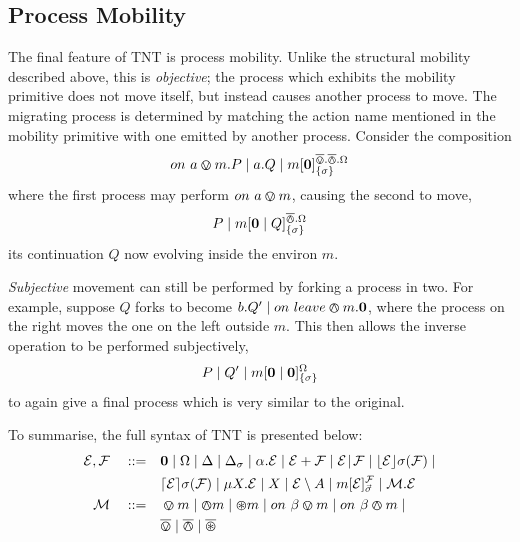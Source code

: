 \documentclass{acm_proc_article-sp}
\begin{document}
\subsection{Process Mobility}
\label{procmob}

The final feature of TNT is process mobility. Unlike the structural
mobility described above, this is \emph{objective}; the process which
exhibits the mobility primitive does not move itself, but instead causes
another process to move.  The migrating process is determined by
matching the action name mentioned in the mobility primitive with one
emitted by another process.  Consider the composition
\begin{displaymath}
  on\ a \varovee m.P \mid a.Q \mid {m}[ \textbf{0} ]^{\overline{\varovee}.\overline{\varowedge}.\Omega}_{\{\sigma\}}
\end{displaymath}
where the first process may perform $on\ a \varovee m$, causing the second
to move,
\begin{displaymath}
P \mid {m}[ \textbf{0} \mid Q ]^{\overline{\varowedge}.\Omega}_{\{\sigma\}}
\end{displaymath}
its continuation $Q$ now evolving inside the environ $m$.

\emph{Subjective} movement can still be performed by forking a process
in two. For example, suppose $Q$ forks to become $b.Q' \mid
on\ leave \varowedge m.\textbf{0}$, where the process on the right moves the one
on the left outside $m$. This then allows the inverse operation to be
performed subjectively,
\begin{displaymath}
P \mid Q' \mid {m}[ \textbf{0} \mid \textbf{0} ]^{\Omega}_{\{\sigma\}}
\end{displaymath}
to again give a final process which is very similar to the original.

To summarise, the full syntax of TNT is presented below:
\begin{equation*}
  \begin{aligned}
    \text{$\mathcal{E}$}, \text{$\mathcal{F}$} \quad \mathrel{::=} \quad &
      \textbf{0}  \mid
      \Omega \mid
      \Delta \mid
      \Delta_{\sigma} \mid
      \alpha . \text{$\mathcal{E}$}  \mid
      \text{$\mathcal{E}$} + \text{$\mathcal{F}$} \mid
      \text{$\mathcal{E}$} \mathrel{\!|\!} \text{$\mathcal{F}$} \mid
      \lfloor{\text{$\mathcal{E}$}}\rfloor {\sigma} ({\text{$\mathcal{F}$}}) \mid \\
    & \lceil{\text{$\mathcal{E}$}}\rceil {\sigma} ({\text{$\mathcal{F}$}}) \mid 
      \mu X . \text{$\mathcal{E}$} \mid
      X \mid 
      \text{$\mathcal{E}$} \setminus {A} \mid
      {m}[ \text{$\mathcal{E}$} ]^{\text{$\mathcal{F}$}}_{\vec{\sigma}} \mid
      \text{$\mathcal{M}$} . \text{$\mathcal{E}$} \\
   \text{$\mathcal{M}$} \quad \mathrel{::=} \quad & \varovee m \mid \varowedge m \mid \varoast m \mid
      on\ \beta \varovee m \mid on\ \beta \varowedge m \mid \\
   & \overline{\varovee} \mid \overline{\varowedge} \mid \overline{\varoast}
   \end{aligned}
\end{equation*}
\end{document}

